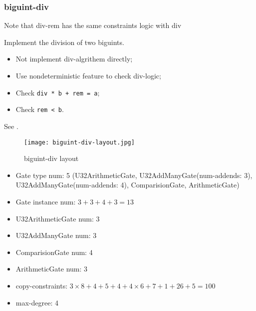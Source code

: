 \subsubsection{biguint-div}

Note that div-rem has the same constraints logic with div

Implement the division of two biguints.

\begin{itemize}
    \item Not implement div-algrithem directly;
    \item Use nondeterministic feature to check div-logic;
    \item Check \verb|div * b + rem = a|;
    \item Check \verb|rem < b|.
\end{itemize}

See .
\begin{figure}[!ht]
    \centering
    \texttt{[image: biguint-div-layout.jpg]}
    \caption{biguint-div layout}
    \label{fig:biguint-div-layout}
\end{figure}

\begin{itemize}
    \item Gate type num: 5 (U32ArithmeticGate, U32AddManyGate(num-addends: 3), U32AddManyGate(num-addends: 4), ComparisionGate, ArithmeticGate)
    \item Gate instance num: $3 + 3 + 4 + 3 = 13$
    \item U32ArithmeticGate num: 3
    \item U32AddManyGate num: 3
    \item ComparisionGate num: 4
    \item ArithmeticGate num: 3
    \item copy-constraints: $3 \times 8 + 4 + 5 + 4 + 4 \times 6 + 7 + 1 + 26 + 5 = 100$
    \item max-degree: 4
\end{itemize}
